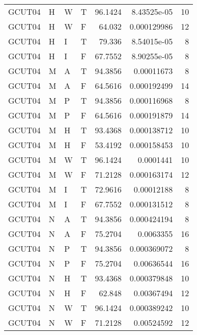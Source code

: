 \begin{longtable}{llllrrr}
    GCUT04   & H     & W     & T          & 96.1424    & 8.43525e-05 & 10       \\
    GCUT04   & H     & W     & F          & 64.032     & 0.000129986 & 12       \\
    GCUT04   & H     & I     & T          & 79.336     & 8.54015e-05 & 8        \\
    GCUT04   & H     & I     & F          & 67.7552    & 8.90255e-05 & 8        \\
    GCUT04   & M     & A     & T          & 94.3856    & 0.00011673  & 8        \\
    GCUT04   & M     & A     & F          & 64.5616    & 0.000192499 & 14       \\
    GCUT04   & M     & P     & T          & 94.3856    & 0.000116968 & 8        \\
    GCUT04   & M     & P     & F          & 64.5616    & 0.000191879 & 14       \\
    GCUT04   & M     & H     & T          & 93.4368    & 0.000138712 & 10       \\
    GCUT04   & M     & H     & F          & 53.4192    & 0.000158453 & 10       \\
    GCUT04   & M     & W     & T          & 96.1424    & 0.0001441   & 10       \\
    GCUT04   & M     & W     & F          & 71.2128    & 0.000163174 & 12       \\
    GCUT04   & M     & I     & T          & 72.9616    & 0.00012188  & 8        \\
    GCUT04   & M     & I     & F          & 67.7552    & 0.000131512 & 8        \\
    GCUT04   & N     & A     & T          & 94.3856    & 0.000424194 & 8        \\
    GCUT04   & N     & A     & F          & 75.2704    & 0.0063355   & 16       \\
    GCUT04   & N     & P     & T          & 94.3856    & 0.000369072 & 8        \\
    GCUT04   & N     & P     & F          & 75.2704    & 0.00636544  & 16       \\
    GCUT04   & N     & H     & T          & 93.4368    & 0.000379848 & 10       \\
    GCUT04   & N     & H     & F          & 62.848     & 0.00367494  & 12       \\
    GCUT04   & N     & W     & T          & 96.1424    & 0.000389242 & 10       \\
    GCUT04   & N     & W     & F          & 71.2128    & 0.00524592  & 12       \\

\end{longtable}
